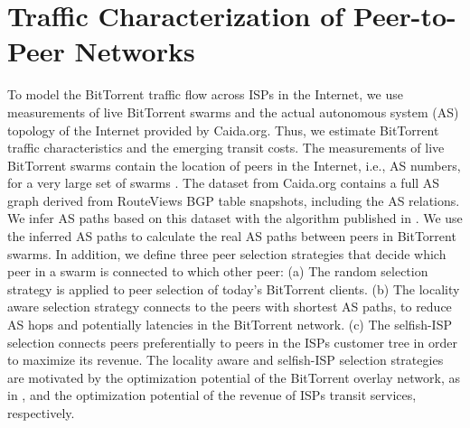 \section{Traffic Characterization of Peer-to-Peer Networks}\label{sec:aslevel:p2p}


To model the BitTorrent traffic flow across ISPs in the Internet, we use measurements of live BitTorrent swarms and the actual autonomous system (AS) topology of the Internet provided by Caida.org. Thus, we estimate BitTorrent traffic characteristics and the emerging transit costs.
The measurements of live BitTorrent swarms contain the location of peers in the Internet, i.e., AS numbers, for a very large set of swarms \cite{Hossfeld2011}.
The dataset from Caida.org contains a full AS graph derived from RouteViews BGP table snapshots, including the AS relations. We infer AS paths based on this dataset with the algorithm published in \cite{yang2009efficient}.
We use the inferred AS paths to calculate the real AS paths between peers in BitTorrent swarms. In addition, we define three peer selection strategies that decide which peer in a swarm is connected to which other peer: (a) The random selection strategy is applied to peer selection of today's BitTorrent clients. (b) The locality aware selection strategy connects to the peers with shortest AS paths, to reduce AS hops and potentially latencies in the BitTorrent network. (c) The selfish-ISP selection connects peers preferentially to peers in the ISPs customer tree in order to maximize its revenue. The locality aware and selfish-ISP selection strategies are motivated by the optimization potential of the BitTorrent overlay network, as in \cite{Hossfeld2011}, and the optimization potential of the revenue of ISPs transit services, respectively.

